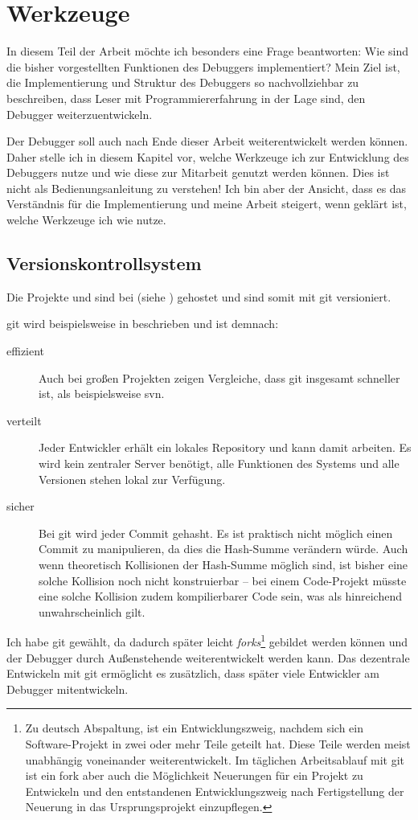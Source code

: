 \chapter{Werkzeuge}
In diesem Teil der Arbeit möchte ich besonders eine Frage beantworten: Wie sind die bisher vorgestellten Funktionen des Debuggers implementiert? Mein Ziel ist, die Implementierung und Struktur des Debuggers so nachvollziehbar zu beschreiben, dass Leser mit Programmiererfahrung in der Lage sind, den Debugger weiterzuentwickeln.

Der Debugger soll auch nach Ende dieser Arbeit weiterentwickelt werden können. Daher stelle ich in diesem Kapitel vor, welche Werkzeuge ich zur Entwicklung des Debuggers nutze und wie diese zur Mitarbeit genutzt werden können. Dies ist nicht als Bedienungsanleitung zu verstehen! Ich bin aber der Ansicht, dass es das Verständnis für die Implementierung und meine Arbeit steigert, wenn geklärt ist, welche Werkzeuge ich wie nutze.

\section{Versionskontrollsystem}
Die Projekte \md und \mdg sind bei  (siehe \cite{Roesch2012,Roesch2012gui}) gehostet und sind somit mit \gls{git} versioniert.

\gls{git} wird beispielsweise in \cite{Ohne1} beschrieben und ist demnach:
\begin{description}
\item[effizient] Auch bei großen Projekten zeigen Vergleiche, dass \gls{git} insgesamt schneller ist, als beispielsweise \gls{svn}.
\item[verteilt] Jeder Entwickler erhält ein lokales Repository und kann damit arbeiten. Es wird kein zentraler Server benötigt, alle Funktionen des Systems und alle Versionen stehen lokal zur Verfügung.
\item[sicher] Bei \gls{git} wird jeder Commit gehasht. Es ist praktisch nicht möglich einen Commit zu manipulieren, da dies die Hash-Summe verändern würde. Auch wenn theoretisch Kollisionen der Hash-Summe möglich sind, ist bisher eine solche Kollision noch nicht konstruierbar -- bei einem Code-Projekt müsste eine solche Kollision zudem kompilierbarer Code sein, was als hinreichend unwahrscheinlich gilt.
\end{description}

Ich habe \gls{git} gewählt, da dadurch später leicht \emph{forks}\footnote{Zu deutsch Abspaltung, ist ein Entwicklungszweig, nachdem sich ein Software-Projekt in zwei oder mehr Teile geteilt hat. Diese Teile werden meist unabhängig voneinander weiterentwickelt. Im täglichen Arbeitsablauf mit \gls{git} ist ein fork aber auch die Möglichkeit Neuerungen für ein Projekt zu Entwickeln und den entstandenen Entwicklungszweig nach Fertigstellung der Neuerung in das Ursprungsprojekt einzupflegen.} gebildet werden können und der Debugger durch Außenstehende weiterentwickelt werden kann. Das dezentrale Entwickeln mit \gls{git} ermöglicht es zusätzlich, dass später viele Entwickler am Debugger mitentwickeln.


